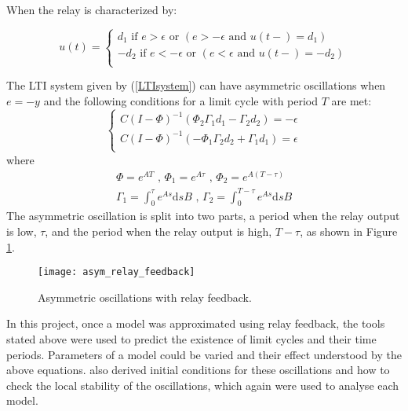 \documentclass[a4paper, 12pt]{article}
\begin{document}
When the relay is characterized by:

\begin{equation}
	u(t)=\begin{cases}
	               d_1 \text{ if } e > \epsilon \text{ or } (e >-\epsilon \text{ and } u(t-) = d_1)\\
	                -d_2 \text{ if } e < -\epsilon \text{ or } (e < \epsilon \text{ and } u(t-) = -d_2)\\
	              
	            \end{cases}
                \label{asymmetric_relay_equation}
\end{equation}

The LTI system given by (\ref{LTIsystem}) can have asymmetric oscillations when $e=-y$ and the following conditions for a limit cycle with period $T$ are met:
\begin{equation}
\begin{cases}
C(I-\Phi)^{-1}(\Phi_2\Gamma_1d_1-\Gamma_2d_2) = -\epsilon \\
C(I-\Phi)^{-1}(-\Phi_1\Gamma_2d_2+\Gamma_1d_1) = \epsilon \\
\end{cases}
 \label{eqtn5_2}
\end{equation}
where
\begin{equation}
\begin{array}{l}
\displaystyle \Phi = e^{AT}  \text{  ,  }\Phi_1 = e^{A\tau} \text{  ,  }  \Phi_2 = e^{A(T-\tau)} \\
\displaystyle \Gamma_1 = \int_0^\tau e^{As}\text{d}sB \text{  ,  } \Gamma_2 = \int_0^{T-\tau}e^{As}\text{d}sB
\end{array}
\end{equation}
The asymmetric oscillation is split into two parts, a period when the relay output is low, $\tau$, and the period when the relay output is high, $T-\tau$, as shown in Figure \ref{fig:asym_relay_oscillations}.

\begin{figure}[h!]
\texttt{[image: asym\_relay\_feedback]}
\caption{Asymmetric oscillations with relay feedback.}
\label{fig:asym_relay_oscillations}
\end{figure}

In this project, once a model was approximated using relay feedback, the tools stated above were used to predict the existence of limit cycles and their time periods. Parameters of a model could be varied and their effect understood by the above equations. \cite{astrom1995} also derived initial conditions for these oscillations and how to check the local stability of the oscillations, which again were used to analyse each model.
\end{document}
